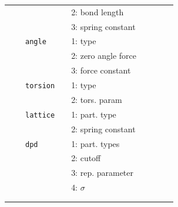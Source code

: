 \documentclass[11pt]{article}
\begin{document}
\begin{center}
\begin{tabular}{cclclclll}
                    &&             && 2: bond length && \\
                    &&             && 3: spring constant && \\
                    && \verb!angle!&& 1: type && \\  
                    &&             && 2: zero angle force && \\
                    &&             && 3: force constant && \\            
                    && \verb!torsion! && 1: type && \\  
                    &&             && 2: tors. param && \\
                    && \verb!lattice! && 1: part. type && \\
                    &&               && 2: spring constant && \\   
                    && \verb!dpd! && 1: part. types && \\
                    &&            && 2: cutoff && \\  
                    &&            && 3: rep. parameter && \\ 
                    &&            && 4: $\sigma$ && \\
                                   && && && \\
    \hline
    && && && 
  \end{tabular}

\end{center}
\end{document}
